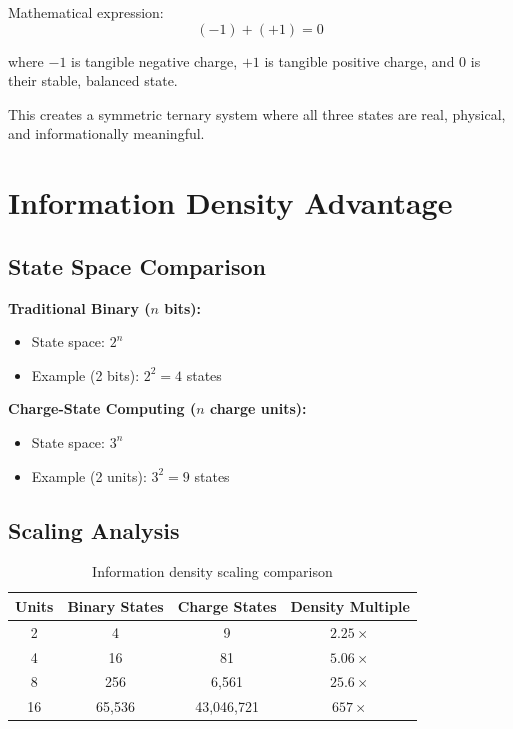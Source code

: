 \documentclass[11pt,a4paper]{article}
\begin{document}
Mathematical expression:
\begin{equation}
(-1) + (+1) = 0
\end{equation}

where $-1$ is tangible negative charge, $+1$ is tangible positive charge, and $0$ is their stable, balanced state.

This creates a symmetric ternary system where all three states are real, physical, and informationally meaningful.

\section{Information Density Advantage}

\subsection{State Space Comparison}

\textbf{Traditional Binary ($n$ bits):}
\begin{itemize}
\item State space: $2^n$
\item Example (2 bits): $2^2 = 4$ states
\end{itemize}

\textbf{Charge-State Computing ($n$ charge units):}
\begin{itemize}
\item State space: $3^n$
\item Example (2 units): $3^2 = 9$ states
\end{itemize}

\subsection{Scaling Analysis}

\begin{table}[h]
\centering
\begin{tabular}{|c|c|c|c|}
\hline
Units & Binary States & Charge States & Density Multiple \\
\hline
2 & 4 & 9 & $2.25\times$ \\
4 & 16 & 81 & $5.06\times$ \\
8 & 256 & 6,561 & $25.6\times$ \\
16 & 65,536 & 43,046,721 & $657\times$ \\
\hline
\end{tabular}
\caption{Information density scaling comparison}
\end{table}
\end{document}
